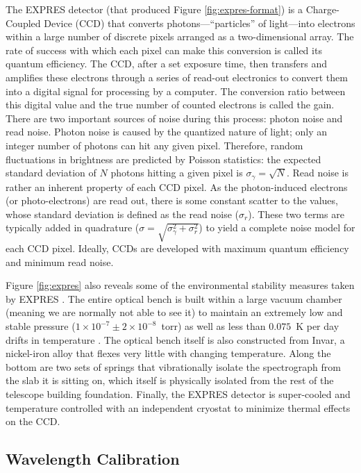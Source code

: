 The EXPRES detector (that produced Figure \ref{fig:expres-format}) is a Charge-Coupled Device (CCD) that converts photons---``particles'' of light---into electrons within a large number of discrete pixels arranged as a two-dimensional array. The rate of success with which each pixel can make this conversion is called its quantum efficiency. The CCD, after a set exposure time, then transfers and amplifies these electrons through a series of read-out electronics to convert them into a digital signal for processing by a computer. The conversion ratio between this digital value and the true number of counted electrons is called the gain. There are two important sources of noise during this process: photon noise and read noise. Photon noise is caused by the quantized nature of light; only an integer number of photons can hit any given pixel. Therefore, random fluctuations in brightness are predicted by Poisson statistics: the expected standard deviation of $N$ photons hitting a given pixel is $\sigma_\gamma=\sqrt{N}$. Read noise is rather an inherent property of each CCD pixel. As the photon-induced electrons (or photo-electrons) are read out, there is some constant scatter to the values, whose standard deviation is defined as the read noise ($\sigma_r$). These two terms are typically added in quadrature ($\sigma=\sqrt{\sigma_\gamma^2 + \sigma_r^2}$) to yield a complete noise model for each CCD pixel. Ideally, CCDs are developed with maximum quantum efficiency and minimum read noise.

Figure \ref{fig:expres} also reveals some of the environmental stability measures taken by EXPRES \citep{jurgenson_expres_2016}. The entire optical bench is built within a large vacuum chamber (meaning we are normally not able to see it) to maintain an extremely low and stable pressure ($1\times 10^{-7} \pm 2\times 10^{-8}$~torr) as well as less than $0.075$~K per day drifts in temperature \citep{blackman_performance_2020}. The optical bench itself is also constructed from Invar, a nickel-iron alloy that flexes very little with changing temperature. Along the bottom are two sets of springs that vibrationally isolate the spectrograph from the slab it is sitting on, which itself is physically isolated from the rest of the telescope building foundation. Finally, the EXPRES detector is super-cooled and temperature controlled with an independent cryostat to minimize thermal effects on the CCD.

\subsection{Wavelength Calibration} \label{intro:wvln_cal}

